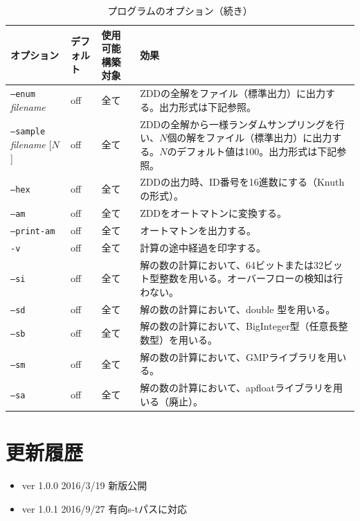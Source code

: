 \documentclass{jsarticle}
\begin{document}
\begin{table}
\caption{プログラムのオプション（続き）}
\label{tab:option3}
\begin{center}
\begin{tabular}[t]{|p{120pt}|p{50pt}|p{80pt}|p{180pt}|}
\hline%
オプション & デフォルト & 使用可能構築対象 & 効果 \\ \hline \hline
\texttt{--enum} \textit{filename} & off & 全て & ZDDの全解をファイル（標準出力）に出力する。出力形式は下記参照。 \\ \hline
\texttt{--sample} \textit{filename} [$N$] & off & 全て & ZDDの全解から一様ランダムサンプリングを行い、$N$個の解をファイル（標準出力）に出力する。$N$のデフォルト値は100。出力形式は下記参照。 \\ \hline
\texttt{--hex} & off & 全て & ZDDの出力時、ID番号を16進数にする（Knuth の形式）。 \\ \hline
\texttt{--am} & off & 全て & ZDDをオートマトンに変換する。\\ \hline
\texttt{--print-am} & off & 全て & オートマトンを出力する。 \\ \hline
\texttt{-v} & off & 全て & 計算の途中経過を印字する。\\ \hline
\texttt{--si} & off & 全て & 解の数の計算において、64ビットまたは32ビット型整数を用いる。オーバーフローの検知は行わない。\\ \hline
\texttt{--sd} & off & 全て & 解の数の計算において、double 型を用いる。\\ \hline
\texttt{--sb} & off & 全て & 解の数の計算において、BigInteger型（任意長整数型）を用いる。\\ \hline
\texttt{--sm} & off & 全て & 解の数の計算において、GMPライブラリを用いる。\\ \hline
\texttt{--sa} & off & 全て & 解の数の計算において、apfloatライブラリを用いる（廃止）。\\ \hline
\end{tabular}
\end{center}
\end{table}

\section{更新履歴}

\begin{itemize}
\item ver 1.0.0 2016/3/19 新版公開
\item ver 1.0.1 2016/9/27 有向s-tパスに対応
\end{itemize}
\end{document}

